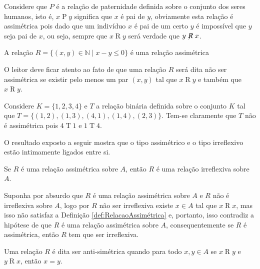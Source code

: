 \begin{exemplo}
	Considere que $P$ é a relação de paternidade definida sobre o conjunto dos seres humanos, isto é, $x \mathrel{P} y$ significa que $x$ é pai de $y$, obviamente esta relação é assimétrica pois dado que um indivíduo $x$ é pai de um certo $y$ é impossível que $y$ seja pai de $x$, ou seja, sempre que $x \mathrel{R} y$ será verdade que $y \centernot{R} x$.
\end{exemplo}

\begin{exemplo}
	A relação $R = \{(x, y) \in \mathbb{N} \mid x - y \leq 0\}$ é uma relação assimétrica 
\end{exemplo}

O leitor deve ficar atento ao fato de que uma relação $R$ será dita não ser assimétrica se existir pelo menos um par $(x,y)$ tal que $x \mathrel{R} y$ e também que  $x \mathrel{R} y$.

\begin{exemplo}
	Considere  $K = \{1, 2, 3, 4\}$ e $T$ a relação binária definida sobre o conjunto $K$ tal que $T = \{(1,2), (1, 3), (4, 1), (1, 4), (2, 3)\}$. Tem-se claramente que $T$ não é assimétrica pois $4 \mathrel{T} 1$ e $1 \mathrel{T} 4$.
\end{exemplo}

O resultado exposto a seguir mostra que o tipo assimétrico e o tipo irreflexivo estão intimamente ligados entre si.

\begin{teorema}
	Se $R$ é uma relação assimétrica sobre $A$, então $R$ é uma relação irreflexiva sobre $A$.
\end{teorema}

\begin{prova}
	Suponha por absurdo que $R$ é uma relação assimétrica sobre $A$ e $R$ não é irreflexiva sobre $A$, logo por $R$ não ser irreflexiva existe $x \in A$ tal que  $x \mathrel{R} x$, mas isso não satisfaz a Definição \ref{def:RelacaoAssimétrica} e, portanto, isso contradiz a hipótese de que $R$ é uma relação assimétrica sobre $A$, consequentemente se $R$ é assimétrica, então $R$ tem que ser irreflexiva. 
\end{prova}

\begin{definicao}\label{def:RelacaoAntiSimétrica}
	Uma relação $R$ é dita ser anti-simétrica quando para todo $x, y \in A$ se $x \mathrel{R} y$ e $y \mathrel{R} x$, então $x = y$.
\end{definicao}

